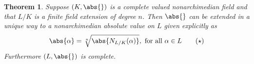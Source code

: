 \documentclass{article}
\newtheorem{theorem}{Theorem}[section]
\begin{document}

\begin{theorem}\label{thm: Extension of absolute value}
    Suppose $(K, \abs{})$ is a complete valued nonarchimedian field and that $L/K$ is a finite field extension of degree $n$. Then $\abs{}$ can be extended in a unique way to a nonarchimedian absolute value on $L$ given explicitly as
    \begin{equation}\label{eq: Extended absolute value}
        \abs{\alpha} = \sqrt[n]{\abs{N_{L/K}(\alpha)}}, \text{ for all } \alpha \in L\tag{$\star$}
    \end{equation}
    Furthermore $(L, \abs{})$ is complete. 
\end{theorem}
\end{document}
